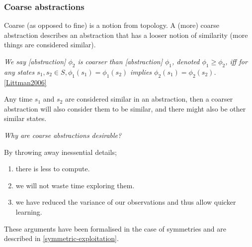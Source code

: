 \subsubsection{Coarse abstractions}


Coarse (as opposed to fine) is a notion from topology.
A (more) coarse abstraction describes an abstraction that has a looser
notion of similarity (more things are considered similar). \footnotemark[24]


\textit{We say [abstraction] $\phi_2$ is coarser than [abstraction] $\phi_1$, denoted $\phi_1 \ge \phi_2$,
iff for any states $s_1, s_2 \in S, \phi_1(s_1) = \phi_1(s_2)$ implies $\phi_2(s_1) = \phi_2(s_2)$.} \ref{Littman2006}

Any time $s_1$ and $s_2$ are considered similar in an abstraction, then a coarser
abstraction will also consider them to be similar, and there might also be other similar states. \footnotemark[25]


\begin{displayquote}
\textit{Why are coarse abstractions desirable?}
\end{displayquote}

By throwing away inessential details;
\begin{enumerate}
  \tightlist
  \item there is less to compute.
  \item we will not waste time exploring them.
  \item we have reduced the variance of our observations and thus allow quicker learning.
\end{enumerate}

These arguments have been formalised in the case of symmetries and are described in \ref{symmetric-exploitation}.


